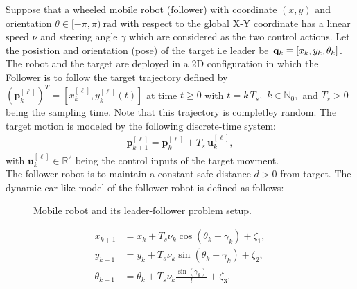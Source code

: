 \documentclass[conference]{IEEEtran}
\begin{document}
Suppose that a wheeled mobile robot (follower) with coordinate $(x,y)$ and orientation $\theta\in[-\pi,\pi)~\si{\radian}$ with respect to the global X-Y coordinate has a linear speed $\nu$ and steering angle $\gamma$ which are considered as the two control actions. Let the posistion and orientation (pose) of the target i.e leader be ${\bf q}_k\equiv[x_k,y_k,\theta_k]$. The robot and the target are deployed in a 2D configuration in which the Follower is to follow the target trajectory defined by  $(\mathbf{p}_k^{[\ell]})^T=[x_k^{[\ell]},y_k^{[\ell]}(t)]$ at time $t\ge 0$ with $t=k \, T_s,$ $k\in\mathbb{N}_0,$ and $T_s>0$ being the sampling time. Note that this trajectory is completley random. The target motion is modeled by the following discrete-time system:
 \begin{align}
   \label{eq:leaderDT}
   \mathbf{p}_{k+1}^{[\ell]} = \mathbf{p}_k^{[\ell]} + T_s \, \mathbf{u}_k^{[\ell]},
 \end{align}  
with $\mathbf{u}_k^{[\ell]}\in\mathbb{R}^2$ being the control inputs of the target movment. 
\\ The follower robot is to maintain a constant safe-distance $d>0$ from target. The dynamic car-like model of the follower robot is defined as follows:
  \begin{figure}
   \centering
   \caption{Mobile robot and its leader-follower problem setup.}
   \label{fig:leaderFollowerSetup}
 \end{figure}
 \begin{subequations}
   \begin{align}
     x_{k+1}& =x_{k}+T_s\nu_{k}\cos{(\theta_{k}+\gamma_{k})} + \zeta_1,\\  
     y_{k+1}& =y_{k}+T_s\nu_{k}\sin{(\theta_{k}+\gamma_{k})}+ \zeta_2,\\
     \theta_{k+1}&=\theta_{k}+T_s\nu_{k}\frac{\sin{(\gamma_{k})}}{l}+ \zeta_3,
   \end{align}
 \label{eq:robotModel1-DT}
 \end{subequations}
\end{document}
